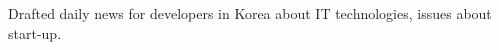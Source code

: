 
\begin{cventries}
  \cventry
    {}
    {}
    {}
    {}
    {
      \begin{cvitems}
        \item {Drafted daily news for developers in Korea about IT technologies, issues about start-up.}
      \end{cvitems}
    }

\end{cventries}